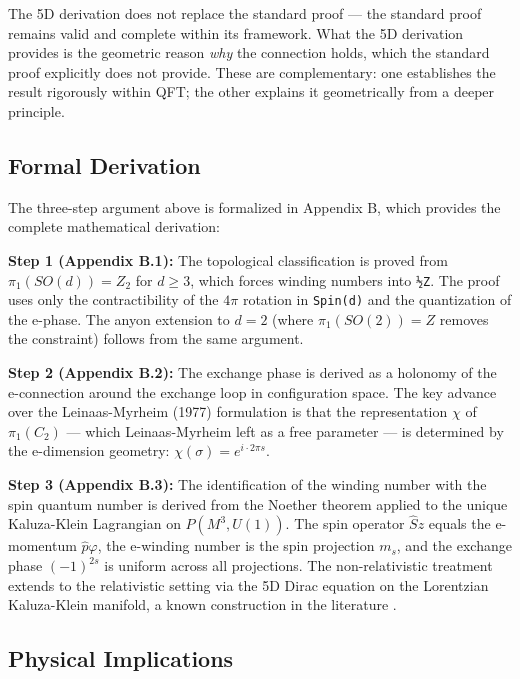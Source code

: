 \documentclass[aps,prd,preprint,superscriptaddress,longbibliography,floatfix]{revtex4-2}
\theoremstyle{remark}
\begin{document}
The 5D derivation does not replace the standard proof --- the standard proof remains valid and complete within its framework. What the 5D derivation provides is the geometric reason \textit{why} the connection holds, which the standard proof explicitly does not provide. These are complementary: one establishes the result rigorously within QFT; the other explains it geometrically from a deeper principle.



\subsection{Formal Derivation}

The three-step argument above is formalized in Appendix B, which provides the complete mathematical derivation:

\textbf{Step 1 (Appendix B.1):} The topological classification is proved from $\pi_{1}(SO(d)) = Z_{2}$ for $d \geq 3$, which forces winding numbers into \texttt{½Z}. The proof uses only the contractibility of the $4\pi$ rotation in \texttt{Spin(d)} and the quantization of the e-phase. The anyon extension to $d = 2$ (where $\pi_{1}(SO(2)) = Z$ removes the constraint) follows from the same argument.

\textbf{Step 2 (Appendix B.2):} The exchange phase is derived as a holonomy of the e-connection around the exchange loop in configuration space. The key advance over the Leinaas-Myrheim (1977) formulation is that the representation $\chi$ of $\pi_{1}(C_{2})$ --- which Leinaas-Myrheim left as a free parameter --- is determined by the e-dimension geometry: $\chi(\sigma) = e^{i\cdot2\pi s}$.

\textbf{Step 3 (Appendix B.3):} The identification of the winding number with the spin quantum number is derived from the Noether theorem applied to the unique Kaluza-Klein Lagrangian on $P(M^{3}, U(1))$. The spin operator $\hat{S}z$ equals the e-momentum $\hat{p}\varphi$, the e-winding number is the spin projection $m_{s}$, and the exchange phase $(-1)^{2s}$ is uniform across all projections. The non-relativistic treatment extends to the relativistic setting via the 5D Dirac equation on the Lorentzian Kaluza-Klein manifold, a known construction in the literature \cite{OverduinWesson1997}.



\subsection{Physical Implications}
\end{document}
